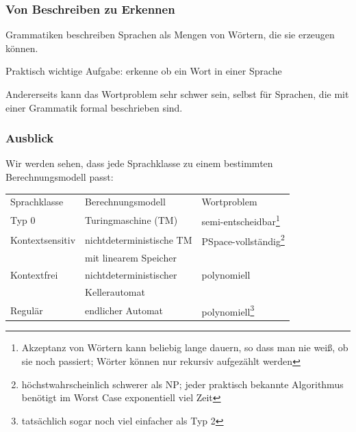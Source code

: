 \documentclass[aspectratio=1610,onlymath]{beamer}
\begin{document}


\begin{frame}\frametitle{Von Beschreiben zu Erkennen}

Grammatiken beschreiben Sprachen als Mengen von Wörtern, die sie \alert{erzeugen} können.
\medskip

Praktisch wichtige Aufgabe: \alert{erkenne} ob ein Wort in einer Sprache 

\pause


Andererseits kann das Wortproblem sehr schwer sein, selbst für Sprachen, die mit einer Grammatik formal beschrieben sind.

\end{frame}

\begin{frame}\frametitle{Ausblick}

Wir werden sehen, dass jede Sprachklasse zu einem bestimmten Berechnungsmodell passt:
\bigskip

\begin{tabular}{@{}lll@{}}
\alert{Sprachklasse} & \alert{Berechnungsmodell} & \alert{Wortproblem}\\
Typ 0 & Turingmaschine (TM) & semi-entscheidbar\footnote{Akzeptanz von Wörtern kann beliebig lange dauern, so dass man nie weiß, ob sie noch passiert; Wörter können nur rekursiv aufgezählt werden}\\
Kontextsensitiv & nichtdeterministische TM & PSpace-vollständig\footnote{höchstwahrscheinlich schwerer als NP; jeder praktisch bekannte Algorithmus benötigt im Worst Case exponentiell viel Zeit}\\[-1ex]
	&  mit linearem Speicher & \\
Kontextfrei & nichtdeterministischer & polynomiell\\[-1ex]
	&  Kellerautomat & \\
Regulär & endlicher Automat & polynomiell\footnote{tatsächlich sogar noch viel einfacher als Typ 2}
\end{tabular}
% 

\end{frame}
\end{document}
